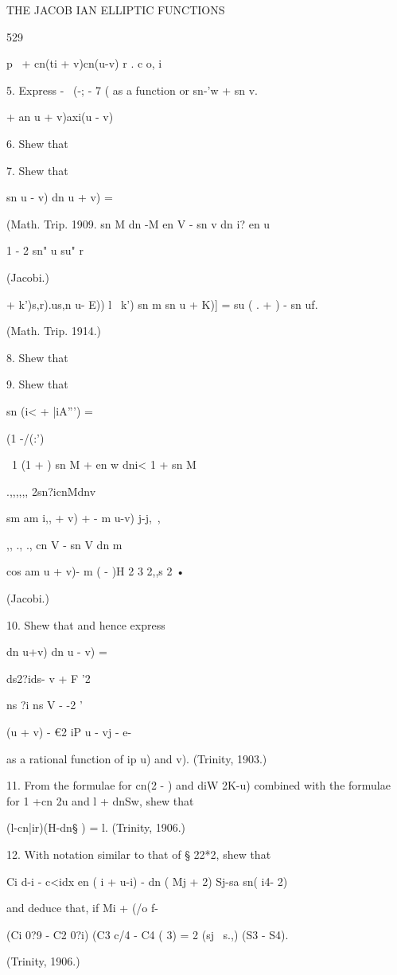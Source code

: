 THE JACOB IAN ELLIPTIC FUNCTIONS

529

p \ + cn(ti + v)cn(u-v) r . c o, i

5. Express - \ (-; - 7 ( as a function or sn-'w + sn v.

   + an u + v)axi(u - v)

6. Shew that

7. Shew that

sn u - v) dn u + v) =

(Math. Trip. 1909. sn M dn -M en V - sn v dn i? en u

1 - 2 sn" u su" r

(Jacobi.)

    + k')s,r).us,n u- E)) l~ k') sn m sn u + K)] = su ( . + ) - sn uf.

(Math. Trip. 1914.)

8. Shew that

9. Shew that

sn (i< + |iA''') =

(1 -/(:')

\ 1 (1 + ) sn M + en w dni< 1 + sn M

.,,,,,, 2sn?icnMdnv

sm am i,, + v) + - m u-v) j-j,~,

,, ., ., cn V - sn V dn m

cos am u + v)- m ( - )H 2 3 2,,s 2 •

(Jacobi.)

10. Shew that and hence express

dn u+v) dn u - v) =

ds2?ids- v + F '2

ns ?i ns V - -2 '

(u + v) - €2 iP u - vj - e-

as a rational function of ip u) and v). (Trinity, 1903.)

11. From the formulae for cn(2 - ) and diW 2K-u) combined with the
formulae for 1 +cn 2u and l + dnSw, shew that

(l-cn|ir)(H-dn§ ) = l. (Trinity, 1906.)

12. With notation similar to that of § 22*2, shew that

Ci d-i - c<idx en ( i + u-i) - dn ( Mj + 2) Sj-sa sn( i4- 2)

and deduce that, if Mi + (/o f-%

(Ci 0?9 - C2 0?i) (C3 c/4 - C4 ( 3) = 2 (sj \ s.,) (S3 - S4).

(Trinity, 1906.)

